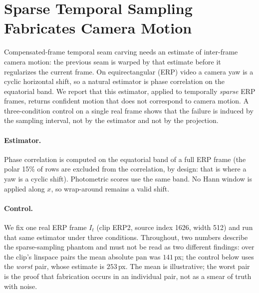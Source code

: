 
\section{Sparse Temporal Sampling Fabricates Camera Motion}
\label{sec:sparse-sampling}

Compensated-frame temporal seam carving needs an estimate of inter-frame
camera motion: the previous seam is warped by that estimate before it
regularizes the current frame. On equirectangular (ERP) video a camera yaw
is a cyclic horizontal shift, so a natural estimator is phase correlation
on the equatorial band. We report that this estimator, applied to
temporally \emph{sparse} ERP frames, returns confident motion that does not
correspond to camera motion. A three-condition control on a single real
frame shows that the failure is induced by the sampling interval, not by
the estimator and not by the projection.

\paragraph{Estimator.}
Phase correlation is computed on the equatorial band of a full ERP frame
(the polar 15\% of rows are excluded from the correlation, by design: that
is where a yaw is a cyclic shift). Photometric scores use the same band.
No Hann window is applied along $x$, so wrap-around remains a valid shift.

\paragraph{Control.}
We fix one real ERP frame $I_t$ (clip ERP2, source index 1626, width 512)
and run that same estimator under three conditions. Throughout, two
numbers describe the sparse-sampling phantom and must not be read as
two different findings: over the clip's linspace pairs the mean absolute
pan was $141$\,px; the control below uses the \emph{worst} pair, whose
estimate is $253$\,px. The mean is illustrative; the worst pair is the
proof that fabrication occurs in an individual pair, not as a smear of
truth with noise.


